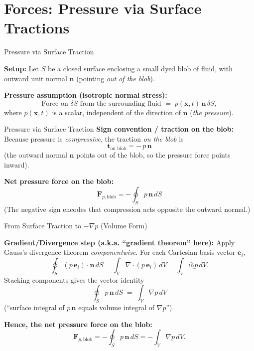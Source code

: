 \documentclass[aspectratio=169]{beamer}
\begin{document}
\section{Forces: Pressure via Surface Tractions}

\begin{frame}{Pressure via Surface Traction}

\textbf{Setup:} Let $S$ be a closed surface enclosing a small dyed blob of fluid,
with outward unit normal $\bm{n}$ (pointing \emph{out of the blob}).

\vspace{0.35cm}

\textbf{Pressure assumption (isotropic normal stress):}
\[
\text{Force on } \delta S \text{ from the surrounding fluid } = \; p(\bm{x},t)\,\bm{n}\,\delta S,
\]
where $p(\bm{x},t)$ is a scalar, independent of the direction of $\bm{n}$ (\emph{the pressure}).

\vspace{0.35cm}
\end{frame}

\begin{frame}{Pressure via Surface Traction}
\textbf{Sign convention / traction on the blob:}
Because pressure is \emph{compressive}, the traction \emph{on the blob} is
\[
\boxed{\;\bm{t}_{\text{on blob}} = -\,p\,\bm{n}\;}
\]
(the outward normal $\bm{n}$ points out of the blob, so the pressure force points inward).

\vspace{0.35cm}

\textbf{Net pressure force on the blob:}
\[
\boxed{\;\bm{F}_{p,\text{blob}} = \displaystyle -\oint_S p\,\bm{n}\,dS\;}
\]
(The negative sign encodes that compression acts opposite the outward normal.)
\end{frame}

\begin{frame}{From Surface Traction to $-\nabla p$ (Volume Form)}

\textbf{Gradient/Divergence step (a.k.a. “gradient theorem” here):}
Apply Gauss’s divergence theorem \emph{componentwise}.
For each Cartesian basis vector $\bm{e}_i$,
\[
\oint_S (p\,\bm{e}_i)\cdot\bm{n}\,dS
= \int_V \nabla\cdot(p\,\bm{e}_i)\,dV
= \int_V \partial_i p\,dV.
\]
Stacking components gives the vector identity
\[
\boxed{\;\oint_S p\,\bm{n}\,dS \;=\; \int_V \nabla p\,dV\;}
\]
(“surface integral of $p\,\bm{n}$ equals volume integral of $\nabla p$”).

\vspace{0.35cm}

\textbf{Hence, the net pressure force on the blob:}
\[
\bm{F}_{p,\text{blob}} = -\oint_S p\,\bm{n}\,dS
= -\int_V \nabla p\,dV.
\]

\end{frame}
\end{document}
